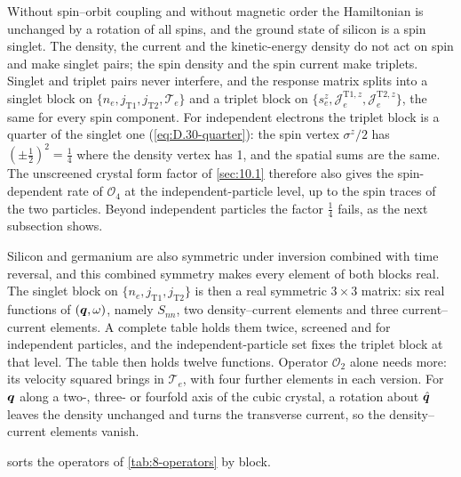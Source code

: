 Without spin--orbit coupling and without magnetic order the Hamiltonian is unchanged by a rotation of all spins, and the ground state of silicon is a spin singlet. The density, the current and the kinetic-energy density do not act on spin and make singlet pairs; the spin density and the spin current make triplets. Singlet and triplet pairs never interfere, and the response matrix splits into a singlet block on $\{n_e, j_{\mathrm{T}1}, j_{\mathrm{T}2}, \mathcal{T}_e\}$ and a triplet block on $\{s^z_e, \mathcal{J}^{\mathrm{T}1,z}_e, \mathcal{J}^{\mathrm{T}2,z}_e\}$, the same for every spin component. For independent electrons the triplet block is a quarter of the singlet one (\cref{eq:D.30-quarter}): the spin vertex $\sigma^z/2$ has $(\pm\frac12)^2 = \frac14$ where the density vertex has 1, and the spatial sums are the same. The unscreened crystal form factor of \cref{sec:10.1} therefore also gives the spin-dependent rate of $\mathcal{O}_4$ at the independent-particle level, up to the spin traces of the two particles. Beyond independent particles the factor $\frac14$ fails, as the next subsection shows.

Silicon and germanium are also symmetric under inversion combined with time reversal, and this combined symmetry makes every element of both blocks real. The singlet block on $\{n_e, j_{\mathrm{T}1}, j_{\mathrm{T}2}\}$ is then a real symmetric $3\times3$ matrix: six real functions of $(\bm{q},\omega)$, namely $S_{nn}$, two density--current elements and three current--current elements. A complete table holds them twice, screened and for independent particles, and the independent-particle set fixes the triplet block at that level. The table then holds twelve functions. Operator $\mathcal{O}_2$ alone needs more: its velocity squared brings in $\mathcal{T}_e$, with four further elements in each version. For $\bm{q}$ along a two-, three- or fourfold axis of the cubic crystal, a rotation about $\hat{\bm{q}}$ leaves the density unchanged and turns the transverse current, so the density--current elements vanish.

 sorts the operators of \cref{tab:8-operators} by block.

